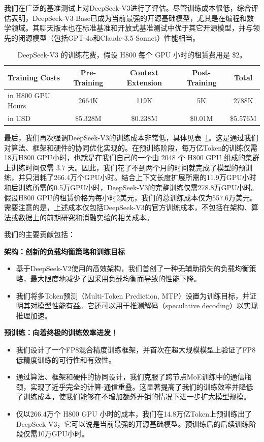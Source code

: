 \documentclass[lang=cn,a4paper,newtx]{elegantpaper}
\newcommand{\dsvii}{DeepSeek-V2}
\newcommand{\dsviii}{DeepSeek-V3}
\begin{document}
我们在广泛的基准测试上对\dsviii{}进行了评估。尽管训练成本很低，综合评估表明，\dsviii{}-Base已成为当前最强的开源基础模型，尤其是在编程和数学领域。其聊天版本也在标准基准和开放式基准测试中优于其它开源模型，并与领先的闭源模型（包括GPT-4o和Claude-3.5-Sonnet）性能相当。

\begin{table}[t]
    \centering
    \setlength{\tabcolsep}{6pt}
    \begin{tabular}{l | c c c | c}
        \toprule
        \textbf{Training Costs} & \textbf{Pre-Training} & \textbf{Context Extension} & \textbf{Post-Training} & \textbf{Total} \\
        \midrule
        in H800 GPU Hours & 2664K & 119K & 5K & 2788K \\
        in USD & \$5.328M & \$0.238M & \$0.01M & \$5.576M \\
        \bottomrule
    \end{tabular}
    \caption{
    \dsviii{} 的训练花费，假设 H800 每个 GPU 小时的租赁费用是 \$2。
    }
    \label{tab:cost}
\end{table}

最后，我们再次强调\dsviii{}的训练成本非常低，具体见表~\ref{tab:cost}。这是通过我们对算法、框架和硬件的协同优化实现的。在预训练阶段，每万亿Token的训练仅需18万H800 GPU小时，也就是在我们自己的一个由 2048 个 H800 GPU 组成的集群上训练时间仅需 3.7 天。因此，我们花了不到两个月的时间就完成了模型的预训练，并只消耗了266.4万个GPU小时。结合上下文长度扩展所需的11.9万GPU小时和后训练所需的0.5万GPU小时，\dsviii{}的完整训练仅需278.8万GPU小时。假设H800 GPU的租赁价格为每小时2美元，我们的总训练成本仅为557.6万美元。需要注意的是，上述成本仅包括\dsviii{}的官方训练成本，不包括在架构、算法或数据上的前期研究和消融实验的相关成本。

我们的主要贡献包括：

\noindent
\textbf{架构：创新的负载均衡策略和训练目标}
\begin{itemize}[topsep=0pt]
    \item
    基于\dsvii{}使用的高效架构，我们首创了一种无辅助损失的负载均衡策略，最大限度地减少了因采用负载均衡而导致的性能下降。
    \item
    我们将多Token预测（Multi-Token Prediction, MTP）设置为训练目标，并证明其对模型性能有益。它还可以用于推测解码（speculative decoding）以实现推理加速。
\end{itemize}

\noindent
\textbf{预训练：向着终极的训练效率进发！}
\begin{itemize}[topsep=0pt]
    \item
    我们设计了一个FP8混合精度训练框架，并首次在超大规模模型上验证了FP8低精度训练的可行性和有效性。
    \item 
    通过算法、框架和硬件的协同设计，我们克服了跨节点MoE训练中的通信瓶颈，实现了近乎完全的计算-通信重叠。这显著提高了我们的训练效率并降低了训练成本，使我们能够在不增加额外开销的情况下进一步扩大模型规模。
    \item
    仅以266.4万个 H800 GPU 小时的成本，我们在14.8万亿Token上预训练出了DeepSeek-V3，它可以说是当前最强的开源基础模型。预训练后的后续训练阶段仅需10万GPU小时。
\end{itemize}
\end{document}
